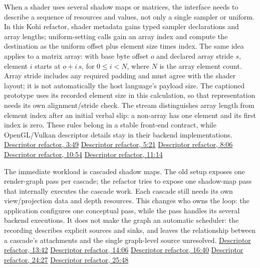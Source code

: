 When a shader uses several shadow maps or matrices, the interface needs to describe a sequence of resources and values, not only a single sampler or uniform. In this Kohi refactor, shader metadata gains typed sampler declarations and array lengths; uniform-setting calls gain an array index and compute the destination as the uniform offset plus element size times index. The same idea applies to a matrix array: with base byte offset \(o\) and declared array stride \(s\), element \(i\) starts at \(o+i\,s\), for \(0\leq i<N\), where \(N\) is the array element count. Array stride includes any required padding and must agree with the shader layout; it is not automatically the host language's payload size. The captioned prototype uses its recorded element size in this calculation, so that representation needs its own alignment/stride check. The stream distinguishes array length from element index after an initial verbal slip: a non-array has one element and its first index is zero. These rules belong in a stable front-end contract, while OpenGL/Vulkan descriptor details stay in their backend implementations. \href{https://www.youtube.com/watch?v=HahgZzF2Dfo&t=229s}{Descriptor refactor, 3:49} \href{https://www.youtube.com/watch?v=HahgZzF2Dfo&t=320s}{Descriptor refactor, 5:21} \href{https://www.youtube.com/watch?v=HahgZzF2Dfo&t=484s}{Descriptor refactor, 8:06} \href{https://www.youtube.com/watch?v=HahgZzF2Dfo&t=653s}{Descriptor refactor, 10:54} \href{https://www.youtube.com/watch?v=HahgZzF2Dfo&t=673s}{Descriptor refactor, 11:14}

The immediate workload is cascaded shadow maps. The old setup exposes one render-graph pass per cascade; the refactor tries to expose one shadow-map pass that internally executes the cascade work. Each cascade still needs its own view/projection data and depth resources. This changes who owns the loop: the application configures one conceptual pass, while the pass handles its several backend executions. It does not make the graph an automatic scheduler: the recording describes explicit sources and sinks, and leaves the relationship between a cascade's attachments and the single graph-level source unresolved. \href{https://www.youtube.com/watch?v=HahgZzF2Dfo&t=820s}{Descriptor refactor, 13:42} \href{https://www.youtube.com/watch?v=HahgZzF2Dfo&t=844s}{Descriptor refactor, 14:06} \href{https://www.youtube.com/watch?v=HahgZzF2Dfo&t=998s}{Descriptor refactor, 16:40} \href{https://www.youtube.com/watch?v=HahgZzF2Dfo&t=1464s}{Descriptor refactor, 24:27} \href{https://www.youtube.com/watch?v=HahgZzF2Dfo&t=1548s}{Descriptor refactor, 25:48}

